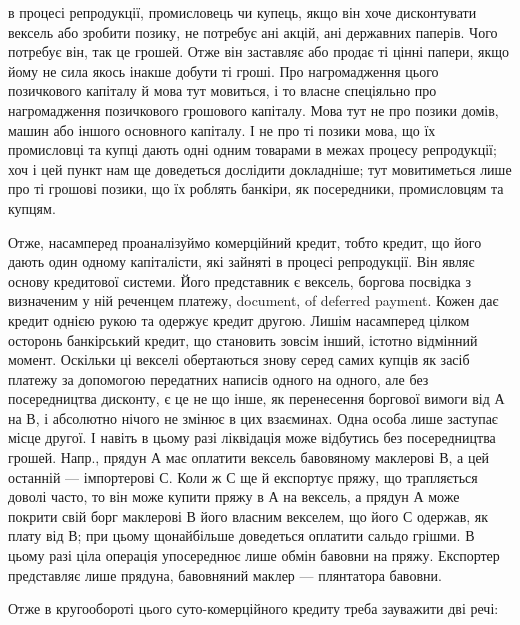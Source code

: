 \parcont{}  %
в процесі репродукції, промисловець чи купець, якщо він хоче дисконтувати
вексель або зробити позику, не потребує ані акцій, ані державних паперів. Чого
потребує він, так це грошей. Отже він заставляє або продає ті цінні папери, якщо
йому не сила якось інакше добути ті гроші. Про нагромадження цього позичкового
капіталу й мова тут мовиться, і то власне спеціяльно про нагромадження позичкового
грошового капіталу. Мова тут не про позики домів, машин або іншого
основного капіталу. І не про ті позики мова, що їх промисловці та купці дають
одні одним товарами в межах процесу репродукції; хоч і цей пункт нам ще
доведеться дослідити докладніше; тут мовитиметься лише про ті грошові позики,
що їх роблять банкіри, як посередники, промисловцям та купцям.

Отже, насамперед проаналізуймо комерційний кредит, тобто кредит, що його
дають один одному капіталісти, які зайняті в процесі репродукції. Він являє
основу кредитової системи. Його представник є вексель, боргова посвідка з визначеним
у ній реченцем платежу, document, of deferred payment. Кожен дає кредит
однією рукою та одержує кредит другою. Лишім насамперед цілком осторонь банкірський
кредит, що становить зовсім інший, істотно відмінний момент. Оскільки ці
векселі обертаються знову серед самих купців як засіб платежу за допомогою
передатних написів одного на одного, але без посередництва дисконту, є це не
що інше, як перенесення боргової вимоги від А на В, і абсолютно нічого не
змінює в цих взаєминах. Одна особа лише заступає місце другої. І навіть
в цьому разі ліквідація може відбутись без посередництва грошей. Напр., прядун
А має оплатити вексель бавовяному маклерові В, а цей останній — імпортерові С.
Коли ж С ще й експортує пряжу, що трапляється доволі часто, то він може
купити пряжу в А на вексель, а прядун А може покрити свій борг маклерові В
його власним векселем, що його С одержав, як плату від В; при цьому щонайбільше
доведеться оплатити сальдо грішми. В цьому разі ціла операція
упосереднює лише обмін бавовни на пряжу. Експортер представляє лише прядуна,
бавовняний маклер — плянтатора бавовни.

Отже в кругообороті цього суто-комерційного кредиту треба зауважити дві речі:

